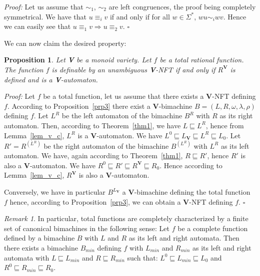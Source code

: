 \documentclass[12pt]{report}
\newtheorem{prp}{Proposition}[section]
\theoremstyle{definition}
\theoremstyle{remark}
\newtheorem{rmk}{Remark}[section]
\newenvironment{prf}
{\textit{Proof:}}
{\hfill $\square$\\}
\begin{document}
\begin{prf}
Let us assume that $\sim_1$, $\sim_2$ are left congruences, the proof being completely symmetrical.
We have that $u\equiv_i v$ if and only if for all $w\in \Sigma^\ast$, $wu\sim_i wv$.
Hence we can easily see that $u\equiv_1 v \Rightarrow u\equiv_2 v$.
\end{prf}

We can now claim the desired property:

\begin{prp}
Let \textbf V be a monoid variety.
Let $f$ be a total rational function.
The function $f$ is definable by an unambiguous \textbf V-NFT if and only if $R^\mathbf V$ is defined and is a \textbf V-automaton.
\end{prp}

\begin{prf}
Let $f$ be a total function, let us assume that there exists a \textbf V-NFT defining $f$. According to Proposition~\ref{prp3} there exist a \textbf V-bimachine $B=(L,R,\omega,\lambda,\rho)$ defining $f$.
Let $L^R$ be the left automaton of the bimachine $B^R$ with $R$ as its right automaton.
Then, according to Theorem~\ref{thm1}, we have ${L} \sqsubseteq {L^R}$, hence from Lemma~\ref{lem_v_c}, $L^R$ is a \textbf V-automaton.
We have ${L^0} \sqsubseteq {L_\mathbf{V}} \sqsubseteq {L^R} \sqsubseteq {L_0}$.
Let $R'=R^{(L^R)}$ be the right automaton of the bimachine $B^{(L^R)}$ with $L^R$ as its left automaton.
We have, again according to Theorem~\ref{thm1}, ${R} \sqsubseteq {R'}$, hence $R'$ is also a \textbf V-automaton.
We have ${R^0} \sqsubseteq {R'} \sqsubseteq {R^\mathbf V} \sqsubseteq {R_0}$. Hence according to Lemma~\ref{lem_v_c}, $R^\mathbf V$ is also a \textbf V-automaton.

Conversely, we have in particular $B^{L_\mathbf V}$ a \textbf V-bimachine defining the total function $f$ hence, according to Proposition~\ref{prp3}, we can obtain a \textbf V-NFT defining $f$.
\end{prf}

\begin{rmk}
In particular, total functions are completely characterized by a finite set of canonical bimachines in the following sense:
Let $f$ be a complete function defined by a bimachine $B$ with $L$ and $R$ as its left and right automata. Then there exists a bimachine $B_{min}$ defining $f$ with $L_{min}$ and $R_{min}$ as its left and right automata with $L\sqsubseteq L_{min}$ and $R\sqsubseteq R_{min}$ such that:
$L^0 \sqsubseteq L_{min} \sqsubseteq L_0$ and $R^0 \sqsubseteq R_{min} \sqsubseteq R_0$.
\end{rmk}
\end{document}
